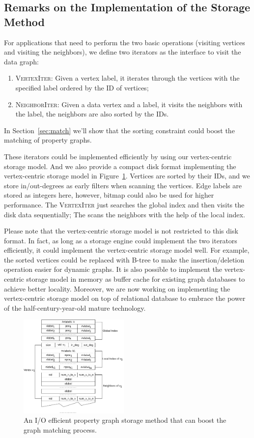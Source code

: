 \subsection{Remarks on the Implementation of the Storage Method}\label{sec:storage_iterators}
For applications that need to perform the two basic operations (visiting vertices and visiting the neighbors),
we define two iterators as the interface to visit the data graph:
\begin{enumerate}[noitemsep]
\item \textsc{VertexIter}: Given a vertex label, it iterates through the vertices with the specified label ordered by the ID of vertices;
\item \textsc{NeighborIter}: Given a data vertex and a label, it visits the neighbors with the label, the neighbors are also sorted by the IDs.
\end{enumerate}
In Section~\ref{sec:match} we'll show that the sorting constraint could boost the matching of property graphs.

These iterators could be implemented efficiently by using our vertex-centric storage model.
And we also provide a compact disk format implementing the vertex-centric storage model in Figure~\ref{img:data_graph}.
Vertices are sorted by their IDs, and we store in/out-degrees as early filters when scanning the vertices.
Edge labels are stored as integers here, however, bitmap could also be used for higher performance.
The \textsc{VertexIter} just searches the global index and then visits the disk data sequentially;
The  scans the neighbors with the help of the local index.

Please note that the vertex-centric storage model is not restricted to this disk format.
In fact, as long as a storage engine could implement the two iterators efficiently,
it could implement the vertex-centric storage model well.
For example, the sorted vertices could be replaced with B-tree to make the insertion/deletion operation easier for dynamic graphs.
It is also possible to implement the vertex-centric storage model in memory as buffer cache for existing graph databases to achieve better locality.
Moreover, we are now working on implementing the vertex-centric storage model on top of relational database to embrace the power of the half-century-year-old mature technology.
\begin{figure}[ht]
  \centering
  \includegraphics[width=0.48\textwidth]{img/data_graph.pdf}
  \caption{An I/O efficient property graph storage method that can boost the graph matching process.}\label{img:data_graph}
\end{figure}
